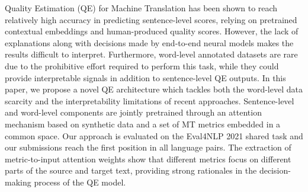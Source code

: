 Quality Estimation (QE) for Machine Translation has been shown to reach relatively high accuracy in predicting sentence-level scores, relying on pretrained contextual embeddings and human-produced quality scores. However, the lack of explanations along with decisions made by end-to-end neural models makes the results difficult to interpret. Furthermore, word-level annotated datasets are rare due to the prohibitive effort required to perform this task, while they could provide interpretable signals in addition to sentence-level QE outputs. In this paper, we propose a novel QE architecture which tackles both the word-level data scarcity and the interpretability limitations of recent approaches. Sentence-level and word-level components are jointly pretrained through an attention mechanism based on synthetic data and a set of MT metrics embedded in a common space. Our approach is evaluated on the Eval4NLP 2021 shared task and our submissions reach the first position in all language pairs. The extraction of metric-to-input attention weights show that different metrics focus on different parts of the source and target text, providing strong rationales in the decision-making process of the QE model.
